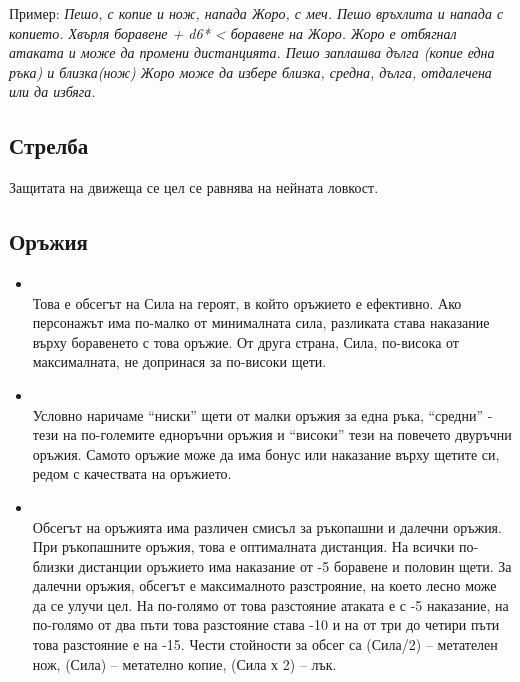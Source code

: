 Пример:
\emph{Пешо, с копие и нож, напада Жоро, с меч.
Пешо връхлита и напада с копието.
Хвърля боравене + d6* < боравене на Жоро.
Жоро е отбягнал атаката и може да промени дистанцията.
Пешо заплашва дълга (копие една ръка) и близка(нож)
Жоро може да избере близка, средна, дълга, отдалечена или да избяга.
}

\subsection{Стрелба}
Защитата на движеща се цел се равнява на нейната ловкост.

\subsection{Оръжия}
\begin{itemize}
\item {} \\
Това е обсегът на Сила на героят, в който оръжието е ефективно.
Ако персонажът има по-малко от минималната сила, разликата става наказание върху боравенето с това оръжие.
От друга страна, Сила, по-висока от максималната, не допринася за по-високи щети.
\item {} \\
Условно наричаме “ниски” щети от малки оръжия за една ръка, “средни” - тези на по-големите
едноръчни оръжия и “високи” тези на повечето двуръчни оръжия.
Самото оръжие може да има бонус или наказание върху щетите си, редом с качествата на оръжието.
\item {} \\
Обсегът на оръжията има различен смисъл за ръкопашни и далечни оръжия.
При ръкопашните оръжия, това е оптималната дистанция.
На всички по-близки дистанции оръжието има наказание от -5 боравене и половин щети.
За далечни оръжия, обсегът е максималното разстрояние, на което лесно може да се улучи цел.
На по-голямо от това разстояние атаката е с -5 наказание, на по-голямо от два пъти това разстояние става -10 и на от три до четири пъти това разстояние е на -15.
Чести стойности за обсег са (Сила/2) – метателен нож, (Сила) – метателно копие, (Сила х 2) – лък.
\end{itemize}

